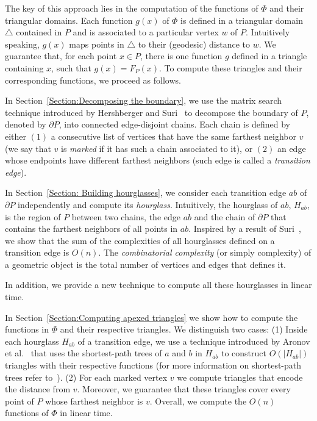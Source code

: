 \documentclass[a4paper,UKenglish]{lipics}
\newcommand{\F}[2]{\ensuremath{F_{\scriptscriptstyle #1}(#2)}}
\begin{document}
The key of this approach lies in the computation of the functions of $\Phi$ and their triangular domains. 
Each function $g(x)$ of $\Phi$ is defined in  a triangular domain $\triangle$ contained in $P$ and is associated to a particular vertex $w$ of $P$. 
Intuitively speaking, $g(x)$ maps points in $\triangle$ to their (geodesic) distance to $w$.
We guarantee that, for each point $x\in P$, there is one function $g$ defined in a triangle containing $x$, such that $g(x) = \F{P}{x}$.
To compute these triangles and their corresponding functions, we proceed as follows.

In Section~\ref{Section:Decomposing the boundary}, we use the matrix search technique introduced by Hershberger and Suri~\cite{hershberger1993matrix} to decompose the boundary of $P$, denoted by $\partial P$, into connected edge-disjoint chains.
Each chain is defined by either $(1)$ a consecutive list of vertices that have the same farthest neighbor $v$ (we say that $v$ is \emph{marked} if it has such a chain associated to it), or $(2)$ an edge whose endpoints have different farthest neighbors (such edge is called a \emph{transition edge}).

In Section~\ref{Section: Building hourglasses}, we consider each transition edge $ab$ of $\partial P$ independently and compute its \emph{hourglass}. Intuitively, the hourglass of $ab$, $H_{ab}$, is the region of $P$ between two chains, the edge $ab$ and the chain of $\partial P$ that contains the farthest neighbors of all points in $ab$.
Inspired by a result of Suri~\cite{suri1989computing}, we show that the sum of the complexities of all hourglasses defined on a transition edge is $O(n)$. The \emph{combinatorial complexity} (or simply complexity) of a geometric object is the total number of vertices and edges that defines it.

In addition, we provide a new technique to compute all these hourglasses in linear time.

In Section~\ref{Section:Computing apexed triangles} we show how to compute the functions in $\Phi$ and their respective triangles.
We distinguish two cases: (1) Inside each hourglass $H_{ab}$ of a transition edge, we use a technique introduced by Aronov et al.~\cite{aronov1993furthest} that uses the shortest-path trees of $a$ and $b$ in $H_{ab}$ to construct $O(|H_{ab}|)$ triangles with their respective functions (for more information on shortest-path trees refer to~\cite{guibasShortestPathTree}). 
(2) For each marked vertex $v$ we compute triangles that encode the distance from $v$. Moreover, we guarantee that these triangles cover every point of $P$ whose farthest neighbor is $v$. 
Overall, we compute the $O(n)$ functions of $\Phi$ in linear time.
\end{document}
